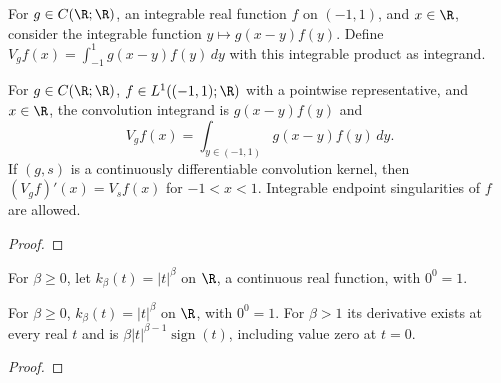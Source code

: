 \begin{supporting}
\begin{definition}
\label{def:interval-convolution}
\leanok
For $g\in C(\R;\R)$, an integrable real function $f$ on $(-1,1)$, and $x\in\R$,
consider the integrable function $y\mapsto g(x-y)f(y)$.
Define $V_gf(x)=\int_{-1}^1 g(x-y)f(y)\,dy$ with this integrable product as integrand.
\end{definition}
\begin{theorem}
\label{thm:interval-convolution}
\leanok
For $g\in C(\R;\R)$, $f\in L^1((-1,1);\R)$ with a pointwise
representative, and $x\in\R$, the convolution integrand is $g(x-y)f(y)$ and
\[
 V_gf(x)=\int_{y\in(-1,1)}g(x-y)f(y)\,dy.
\]
If $(g,s)$ is a continuously differentiable convolution kernel, then
$(V_gf)'(x)=V_sf(x)$ for $-1<x<1$.
Integrable endpoint singularities of $f$ are allowed.
\end{theorem}
\begin{proof}
\leanok
\end{proof}

\begin{definition}
\label{def:abs-power-kernel}
\leanok
For $\beta\ge0$, let $k_\beta(t)=|t|^\beta$ on $\R$, a continuous real function,
with $0^0=1$.
\end{definition}
\begin{theorem}
\label{thm:abs-power-kernel}
\leanok
For $\beta\ge0$, $k_\beta(t)=|t|^\beta$ on $\R$, with $0^0=1$. For $\beta>1$ its derivative exists at
every real $t$ and is $\beta|t|^{\beta-1}\operatorname{sign}(t)$, including value
zero at $t=0$.
\end{theorem}
\begin{proof}
\leanok
\end{proof}


\end{supporting}
